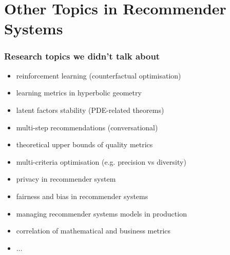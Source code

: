 \documentclass[t]{beamer}
\begin{document}
\section{Other Topics in Recommender Systems}
\begin{frame}
  \frametitle{Research topics we didn't talk about}
  \begin{itemize}
  \item reinforcement learning (counterfactual optimisation)
  \item learning metrics in hyperbolic geometry
  \item latent factors stability (PDE-related theorems)
  \item multi-step recommendations (conversational)
  \item theoretical upper bounds of quality metrics
  \item multi-criteria optimisation (e.g. precision vs diversity)
  \item privacy in recommender system
  \item fairness and bias in recommender systems
  \item managing recommender systems models in production
  \item correlation of mathematical and business metrics
  \item $\dots$
  \end{itemize}
\end{frame}
\end{document}
